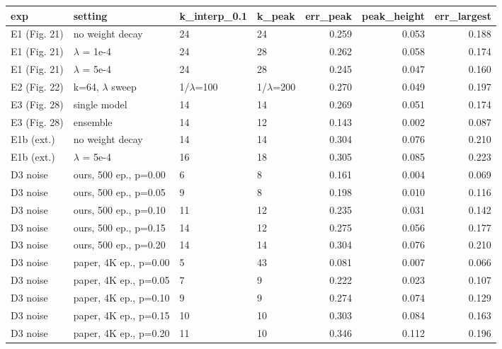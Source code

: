 \begin{tabular}{llllrrr}
\toprule
exp & setting & k_interp_0.1 & k_peak & err_peak & peak_height & err_largest \\
\midrule
E1 (Fig. 21) & no weight decay & 24 & 24 & 0.259 & 0.053 & 0.188 \\
E1 (Fig. 21) & $\lambda$ = 1e-4 & 24 & 28 & 0.262 & 0.058 & 0.174 \\
E1 (Fig. 21) & $\lambda$ = 5e-4 & 24 & 28 & 0.245 & 0.047 & 0.160 \\
E2 (Fig. 22) & k=64, $\lambda$ sweep & 1/$\lambda$=100 & 1/$\lambda$=200 & 0.270 & 0.049 & 0.197 \\
E3 (Fig. 28) & single model & 14 & 14 & 0.269 & 0.051 & 0.174 \\
E3 (Fig. 28) & ensemble & 14 & 12 & 0.143 & 0.002 & 0.087 \\
E1b (ext.) & no weight decay & 14 & 14 & 0.304 & 0.076 & 0.210 \\
E1b (ext.) & $\lambda$ = 5e-4 & 16 & 18 & 0.305 & 0.085 & 0.223 \\
D3 noise & ours, 500 ep., p=0.00 & 6 & 8 & 0.161 & 0.004 & 0.069 \\
D3 noise & ours, 500 ep., p=0.05 & 9 & 8 & 0.198 & 0.010 & 0.116 \\
D3 noise & ours, 500 ep., p=0.10 & 11 & 12 & 0.235 & 0.031 & 0.142 \\
D3 noise & ours, 500 ep., p=0.15 & 14 & 12 & 0.275 & 0.056 & 0.177 \\
D3 noise & ours, 500 ep., p=0.20 & 14 & 14 & 0.304 & 0.076 & 0.210 \\
D3 noise & paper, 4K ep., p=0.00 & 5 & 43 & 0.081 & 0.007 & 0.066 \\
D3 noise & paper, 4K ep., p=0.05 & 7 & 9 & 0.222 & 0.023 & 0.107 \\
D3 noise & paper, 4K ep., p=0.10 & 9 & 9 & 0.274 & 0.074 & 0.129 \\
D3 noise & paper, 4K ep., p=0.15 & 10 & 10 & 0.303 & 0.084 & 0.163 \\
D3 noise & paper, 4K ep., p=0.20 & 11 & 10 & 0.346 & 0.112 & 0.196 \\
\bottomrule
\end{tabular}

